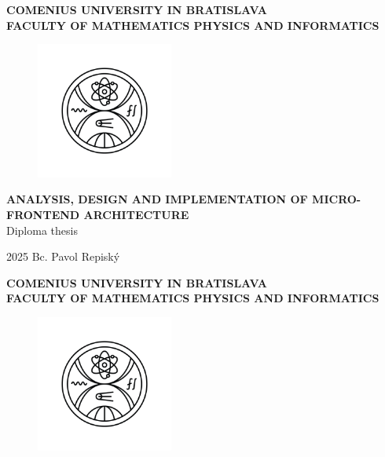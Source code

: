 \documentclass[12pt, oneside]{book}  %
\def\mfrok{2025}
\def\mftitle{Analysis, Design and Implementation of Micro-frontend Architecture}
\def\mfauthor{Bc. Pavol Repiský}
\def\mfuniverzita{COMENIUS UNIVERSITY IN BRATISLAVA}
\def\mffakulta{FACULTY OF MATHEMATICS PHYSICS AND INFORMATICS}
\def\mftypprace{Diploma thesis}
\begin{document}
     
\frontmatter
\pagestyle{empty}

\noindent
\begin{minipage}{\textwidth}
    \begin{center}
      \textbf{\mfuniverzita\\
      \mffakulta}
    \end{center}
\end{minipage}

\vfill
\begin{figure}[!hbt]
	\begin{center}
		\includegraphics[width=0.4\textwidth]{images/FMFI_logo_BP.png}
		\label{img:logo}
	\end{center}
\end{figure}
\begin{center}
		\textbf{\MakeUppercase{\Large\mftitle}}\\
    \mftypprace
\end{center}
\vfill
\mfrok \hfill
\mfauthor
\cleardoublepage



\thispagestyle{empty}
\noindent
\begin{minipage}{\textwidth}
    \begin{center}
      \textbf{\mfuniverzita\\
      \mffakulta}
    \end{center}
\end{minipage}

\vfill
\begin{figure}[!hbt]
    \begin{center}
        \includegraphics[width=0.4\textwidth]{images/FMFI_logo_BP.png}
        \label{img:logo_dark}
    \end{center}
\end{figure}
\end{document}
